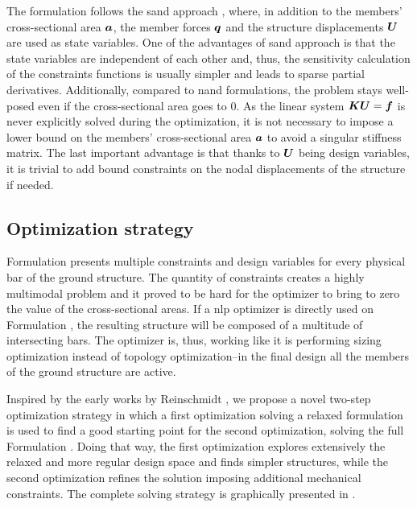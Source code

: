 The formulation follows the \gls{sand} approach , where, in addition to the members' cross-sectional area $\bm{a}$, the member forces $\bm{q}$ and the structure displacements $\bm{U}$ are used as state variables. One of the advantages of \gls{sand} approach is that the state variables are independent of each other and, thus, the sensitivity calculation of the constraints functions is usually simpler and leads to sparse partial derivatives. Additionally, compared to \gls{nand} formulations, the problem stays well-posed even if the cross-sectional area goes to 0. As the linear system $\bm{K}\bm{U}=\bm{f}$ is never explicitly solved during the optimization, it is not necessary to impose a lower bound on the members' cross-sectional area $\bm{a}$ to avoid a singular stiffness matrix. The last important advantage is that thanks to $\bm{U}$ being design variables, it is trivial to add bound constraints on the nodal displacements of the structure if needed.

\subsection{Optimization strategy} \label{sec:04_2step_opt}
Formulation  presents multiple constraints and design variables for every physical bar of the ground structure. The quantity of constraints creates a highly multimodal problem and it proved to be hard for the optimizer to bring to zero the value of the cross-sectional areas. If a \gls{nlp} optimizer is directly used on Formulation , the resulting structure will be composed of a multitude of intersecting bars. The optimizer is, thus, working like it is performing sizing optimization instead of topology optimization--\ie in the final design all the members of the ground structure are active. 

Inspired by the early works by Reinschmidt , we propose a novel two-step optimization strategy in which a first optimization solving a relaxed formulation is used to find a good starting point for the second optimization, solving the full Formulation . Doing that way, the first optimization explores extensively the relaxed and more regular design space and finds simpler structures, while the second optimization refines the solution imposing additional mechanical constraints. The complete solving strategy is graphically presented in .


